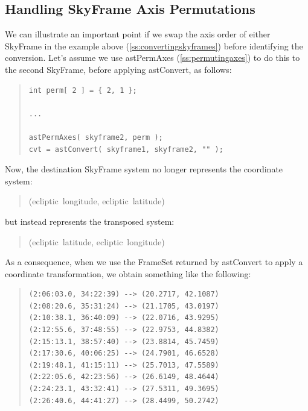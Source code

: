 \documentclass[twoside,11pt]{article}
\newcommand{\htmlref}[2]{#1}
\newcommand{\secref}[1]{\S\ref{#1}}
\renewcommand{\secref}[1]{\ref{#1}}
\begin{document}
\subsection{\label{ss:convertingpermutedaxes}Handling SkyFrame Axis Permutations}

We can illustrate an important point if we swap the axis order of
either \htmlref{SkyFrame}{SkyFrame} in the example above (\secref{ss:convertingskyframes})
before identifying the conversion. Let's assume we use \htmlref{astPermAxes}{astPermAxes}
(\secref{ss:permutingaxes}) to do this to the second SkyFrame, before
applying \htmlref{astConvert}{astConvert}, as follows:

\begin{quote}
\small
\begin{verbatim}
int perm[ 2 ] = { 2, 1 };

...

astPermAxes( skyframe2, perm );
cvt = astConvert( skyframe1, skyframe2, "" );
\end{verbatim}
\normalsize
\end{quote}

Now, the destination SkyFrame system no longer represents the
coordinate system:

\begin{quote}
(ecliptic~longitude, ecliptic~latitude)
\end{quote}

but instead represents the transposed system:

\begin{quote}
(ecliptic~latitude, ecliptic~longitude)
\end{quote}

As a consequence, when we use the \htmlref{FrameSet}{FrameSet} returned by astConvert to
apply a coordinate transformation, we obtain something like the
following:

\begin{quote}
\begin{verbatim}
(2:06:03.0, 34:22:39) --> (20.2717, 42.1087)
(2:08:20.6, 35:31:24) --> (21.1705, 43.0197)
(2:10:38.1, 36:40:09) --> (22.0716, 43.9295)
(2:12:55.6, 37:48:55) --> (22.9753, 44.8382)
(2:15:13.1, 38:57:40) --> (23.8814, 45.7459)
(2:17:30.6, 40:06:25) --> (24.7901, 46.6528)
(2:19:48.1, 41:15:11) --> (25.7013, 47.5589)
(2:22:05.6, 42:23:56) --> (26.6149, 48.4644)
(2:24:23.1, 43:32:41) --> (27.5311, 49.3695)
(2:26:40.6, 44:41:27) --> (28.4499, 50.2742)
\end{verbatim}
\end{quote}
\end{document}
